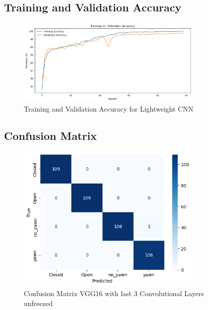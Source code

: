 \documentclass{report} %
\begin{document}
\subsection{Training and Validation Accuracy}

\begin{figure}[H]
\centering
\includegraphics[width=0.8\textwidth]{train_valid_acc_cnn.png}
\caption{Training and Validation Accuracy for Lightweight CNN}
\end{figure}



\subsection{Confusion Matrix}



\begin{figure}[H]
\centering
\includegraphics[width=0.8\textwidth]{vgg_16_unfreeze.png}
\caption{Confusion Matrix VGG16 with last 3 Convolutional Layers unfreezed}
\end{figure}
\end{document}
